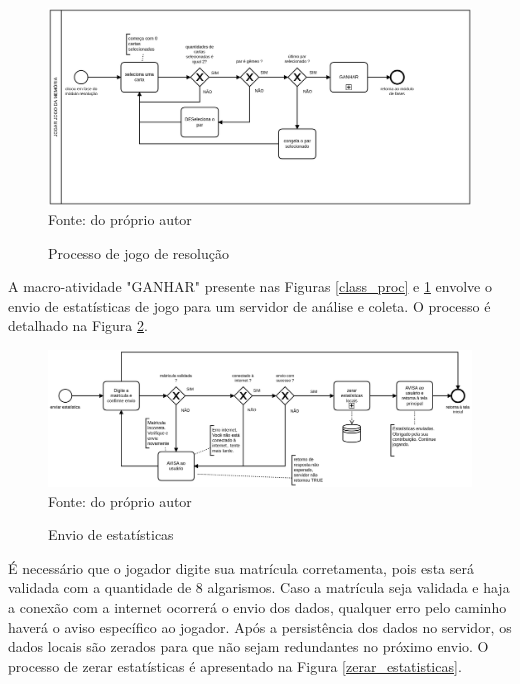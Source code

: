 \begin{figure}[H]
\centering
\caption{Processo de jogo de resolução}
\includegraphics[width=\textwidth,height=\textheight,keepaspectratio]{figuras/processos/processo_resolucao.png}
\label{res_proc}
\small{Fonte: do próprio autor}
\end{figure}

A macro-atividade "GANHAR" presente nas Figuras \ref{class_proc} e \ref{res_proc} envolve o envio de estatísticas de jogo para um servidor de análise e coleta. O processo é detalhado na Figura \ref{envio_estatisticas}.

\begin{figure}[H]
\centering
\caption{Envio de estatísticas}
\includegraphics[width=\textwidth,height=\textheight,keepaspectratio]{figuras/processos/processo_enviar_estatisticas.png}
\label{envio_estatisticas}
\small{Fonte: do próprio autor}
\end{figure}

É necessário que o jogador digite sua matrícula corretamenta, pois esta será validada com a quantidade de 8 algarismos. Caso a matrícula seja validada e haja a conexão com a internet ocorrerá o envio dos dados, qualquer erro pelo caminho haverá o aviso específico ao jogador. Após a persistência dos dados no servidor, os dados locais são zerados para que não sejam redundantes no próximo envio. O processo de zerar estatísticas é apresentado na Figura \ref{zerar_estatisticas}. 

